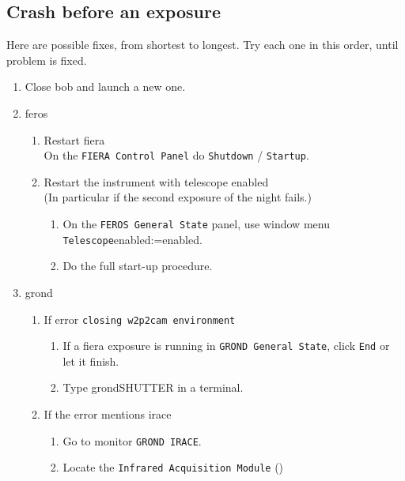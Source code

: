 \documentclass[11pt,fleqn,a4paper]{book}
\makeatletter
\def\menu#1#2{\texttt{#1}\ifx{}#2\else\@for\@x:=#2\do{$\rightarrow$\texttt{\@x}}\fi}
\def\wmenu#1#2{window menu \menu{#1}{#2}}
\makeatother
\begin{document}
\subsection{Crash before an exposure}
\label{sec:expocrash}

Here are possible fixes, from shortest to longest.  Try each one in this
order, until problem is fixed.

\begin{enumerate}
  \item Close \gls{bob} and launch a new one.
  \item \gls{feros}
    \begin{enumerate}
      \item Restart \gls{fiera}\\
            On the \texttt{FIERA Control Panel} do \texttt{Shutdown} / \texttt{Startup}.
            \label{restartfiera}
      \item Restart the instrument with telescope enabled\\
            (In particular if the second exposure of the night fails.)
         \begin{enumerate}
            \item On the \texttt{FEROS \gls{General State}} panel, use \wmenu{Telescope}{enabled}.
            \item Do the full start-up procedure.
         \end{enumerate}
    \end{enumerate}
  \item \gls{grond}
    \begin{enumerate}
       \item If error \texttt{closing \gls{w2p2cam} \gls{environment}}
       \begin{enumerate}
          \item If a \gls{fiera} exposure is running in \texttt{GROND \gls{General State}}, click \texttt{End} or let it finish.
          \item Type \gls{grondSHUTTER} in a terminal.
       \end{enumerate} 
       \item If the error mentions \gls{irace}
       \begin{enumerate}
            \item Go to monitor \texttt{GROND IRACE}.
            \item Locate the \texttt{Infrared Acquisition Module} ()

\end{enumerate}
\end{enumerate}
\end{enumerate}
\end{document}
